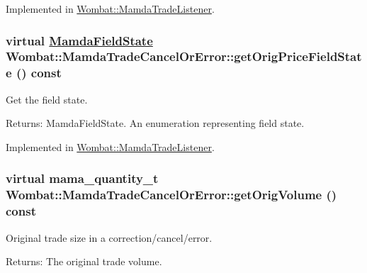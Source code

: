 Implemented in \hyperlink{classWombat_1_1MamdaTradeListener_7550297d285f7e2ab6b6e7060ed28f74}{Wombat::Mamda\-Trade\-Listener}.\hypertarget{classWombat_1_1MamdaTradeCancelOrError_8de66475d67639ac8bbececda9f73d95}{
\subsubsection[getOrigPriceFieldState]{\setlength{\rightskip}{0pt plus 5cm}virtual \hyperlink{namespaceWombat_93aac974f2ab713554fd12a1fa3b7d2a}{Mamda\-Field\-State} Wombat::Mamda\-Trade\-Cancel\-Or\-Error::get\-Orig\-Price\-Field\-State () const}}
\label{classWombat_1_1MamdaTradeCancelOrError_8de66475d67639ac8bbececda9f73d95}


Get the field state. 

\begin{Desc}
\item[Returns:]Mamda\-Field\-State. An enumeration representing field state. \end{Desc}


Implemented in \hyperlink{classWombat_1_1MamdaTradeListener_63ccde5fa2b5725b0b1c4efb0ef70880}{Wombat::Mamda\-Trade\-Listener}.\hypertarget{classWombat_1_1MamdaTradeCancelOrError_e821262ca4d590263adc9a6bacd014b0}{
\subsubsection[getOrigVolume]{\setlength{\rightskip}{0pt plus 5cm}virtual mama\_\-quantity\_\-t Wombat::Mamda\-Trade\-Cancel\-Or\-Error::get\-Orig\-Volume () const}}
\label{classWombat_1_1MamdaTradeCancelOrError_e821262ca4d590263adc9a6bacd014b0}


Original trade size in a correction/cancel/error. 

\begin{Desc}
\item[Returns:]The original trade volume. \end{Desc}


